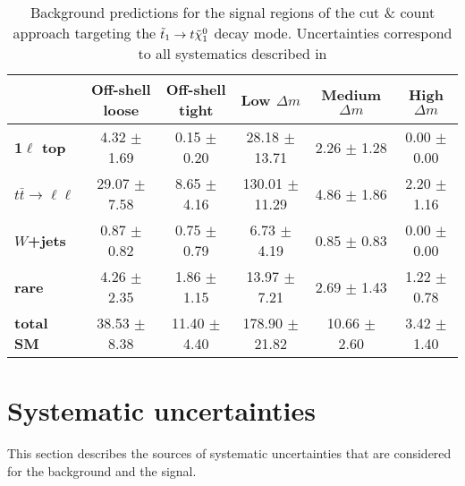     \begin{table}[!ht]
        \begin{center}
            { \footnotesize
            \begin{tabular}{|l|ccccc|}
                \hline
                &
                \textbf{Off-shell loose}    &
                \textbf{Off-shell tight}    &
                \textbf{Low $\Delta m$}     &
                \textbf{Medium $\Delta m$}  &
                \textbf{High $\Delta m$}    \\
                \hline
                \textbf{1$\ell$ top}     & 4.32 $\pm$ 1.69   & 0.15 $\pm$ 0.20   & 28.18 $\pm$ 13.71     & 2.26 $\pm$ 1.28   & 0.00 $\pm$ 0.00   \\
                \textbf{$t\bar{t} \rightarrow \ell \ell$}    & 29.07 $\pm$ 7.58      & 8.65 $\pm$ 4.16   & 130.01 $\pm$ 11.29    & 4.86 $\pm$ 1.86   & 2.20 $\pm$ 1.16   \\
                \textbf{$W$+jets}    & 0.87 $\pm$ 0.82   & 0.75 $\pm$ 0.79   & 6.73 $\pm$ 4.19   & 0.85 $\pm$ 0.83   & 0.00 $\pm$ 0.00   \\
                \textbf{rare}    & 4.26 $\pm$ 2.35   & 1.86 $\pm$ 1.15   & 13.97 $\pm$ 7.21      & 2.69 $\pm$ 1.43   & 1.22 $\pm$ 0.78   \\
                \textbf{total SM}    & 38.53 $\pm$ 8.38      & 11.40 $\pm$ 4.40      & 178.90 $\pm$ 21.82    & 10.66 $\pm$ 2.60      & 3.42 $\pm$ 1.40   \\
                \hline
            \end{tabular}
            }
            \caption{Background predictions for the signal regions of the cut \&
            count approach targeting the $\tilde{t}_1 \rightarrow t \tilde{\chi}_1^0$
            decay mode. Uncertainties correspond to all systematics described in
            }
            \label{tab:report_yield_CnC_T2tt}
        \end{center}
    \end{table}


    \section{Systematic uncertainties \label{sec:analysis_systematics}}

    This section describes the sources of systematic uncertainties that are
    considered for the background and the signal.

